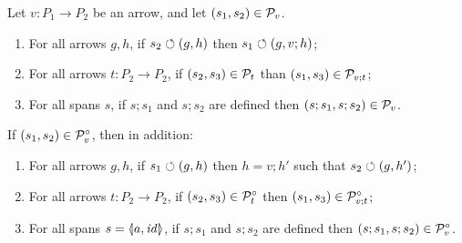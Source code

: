\begin{proposition}
Let $v:P_1\to P_2$ be an arrow, and let $(s_1,s_2)\in \mathcal{P}_v$.
\begin{enumerate}[topsep=\smallskipamount]
\item\label{pattern-preserves} For all arrows $g,h$, if $s_2\circlearrowleft (g,h)$ then $s_1\circlearrowleft (g,v;h)$;
\item\label{pattern-transitive} For all arrows $t:P_2\to P_2$, if $(s_2,s_3)\in \mathcal{P}_t$ than  $(s_1,s_3)\in \mathcal{P}_{v;t}$;
\item\label{pattern-congruence} For all spans $s$, if $s;s_1$ and $s;s_2$ are defined then $(s;s_1,s;s_2)\in \mathcal{P}_v$.
\end{enumerate}
If $(s_1,s_2)\in \mathcal{P}^\circ_v$, then in addition:
\begin{enumerate}[resume,topsep=\smallskipamount]
\item\label{conservative-reflects} For all arrows $g,h$, if $s_1\circlearrowleft (g,h)$ then $h=v;h'$ such that $s_2\circlearrowleft (g,h')$;
\item\label{conservative-transitive} For all arrows $t:P_2\to P_2$, if $(s_2,s_3)\in \mathcal{P}^\circ_t$ then $(s_1,s_3)\in \mathcal{P}^\circ_{v;t}$;
\item\label{conservative-congruence} For all spans $s=\spanof{a}{\id}$, if $s;s_1$ and $s;s_2$ are defined then $(s;s_1,s;s_2)\in \mathcal{P}^\circ_v$.
\end{enumerate}
\end{proposition}
%
